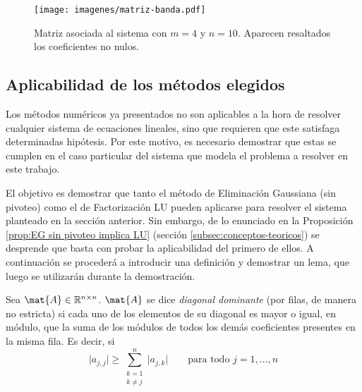         \begin{figure}[h]
          \centering

          \texttt{[image: imagenes/matriz-banda.pdf]}

          \caption{Matriz asociada al sistema con $m = 4$ y $n = 10$. Aparecen resaltados los coeficientes no nulos.}
          \label{fig:matriz-banda}
        \end{figure}

    \subsection{Aplicabilidad de los métodos elegidos}

        Los métodos numéricos ya presentados no son aplicables a la hora de resolver cualquier sistema de ecuaciones lineales, sino que requieren que este satisfaga determinadas hipótesis. Por este motivo, es necesario demostrar que estas se cumplen en el caso particular del sistema que modela el problema a resolver en este trabajo.

        El objetivo es demostrar que tanto el método de Eliminación Gaussiana (sin pivoteo) como el de Factorización LU pueden aplicarse para resolver el sistema planteado en la sección anterior. Sin embargo, de lo enunciado en la Proposición \ref{prop:EG sin pivoteo implica LU} (sección \ref{subsec:conceptos-teoricos}) se desprende que basta con probar la aplicabilidad del primero de ellos. A continuación se procederá a introducir una definición y demostrar un lema, que luego se utilizarán durante la demostración.

        \begin{defi}
            Sea $\mat{A} \in \mathbb{R}^{n \times n}$. $\mat{A}$ se dice \emph{diagonal dominante} (por filas, de manera no estricta) si cada uno de los elementos de su diagonal es mayor o igual, en módulo, que la suma de los módulos de todos los demás coeficientes presentes en la misma fila. Es decir, si
            \[ \vert a_{j,j} \vert \geq \sum_{\substack{k=1 \\ k \neq j}}^n \vert a_{j,k} \vert \qquad \text{para todo $j = 1, \dots, n$} \]
        \end{defi}

